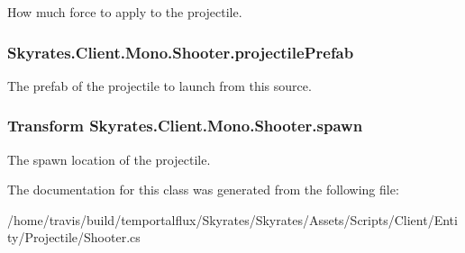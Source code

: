 How much force to apply to the projectile. 

\hypertarget{class_skyrates_1_1_client_1_1_mono_1_1_shooter_a33a43f93da1a0b19f25a6fbe91ed4dd3}{
\subsubsection[{projectile\-Prefab}]{ Skyrates.\-Client.\-Mono.\-Shooter.\-projectile\-Prefab}}\label{class_skyrates_1_1_client_1_1_mono_1_1_shooter_a33a43f93da1a0b19f25a6fbe91ed4dd3}


The prefab of the projectile to launch from this source. 

\hypertarget{class_skyrates_1_1_client_1_1_mono_1_1_shooter_a2aeb7c35dc048f65e02ccecfc654ab2c}{
\subsubsection[{spawn}]{\setlength{\rightskip}{0pt plus 5cm}Transform Skyrates.\-Client.\-Mono.\-Shooter.\-spawn}}\label{class_skyrates_1_1_client_1_1_mono_1_1_shooter_a2aeb7c35dc048f65e02ccecfc654ab2c}


The spawn location of the projectile. 



The documentation for this class was generated from the following file\-:\begin{DoxyCompactItemize}
\item 
/home/travis/build/temportalflux/\-Skyrates/\-Skyrates/\-Assets/\-Scripts/\-Client/\-Entity/\-Projectile/Shooter.\-cs\end{DoxyCompactItemize}
